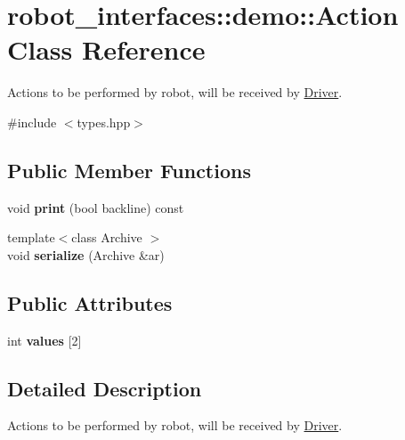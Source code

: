 \hypertarget{classrobot__interfaces_1_1demo_1_1Action}{}\section{robot\+\_\+interfaces\+:\+:demo\+:\+:Action Class Reference}
\label{classrobot__interfaces_1_1demo_1_1Action}


Actions to be performed by robot, will be received by \hyperlink{classDriver}{Driver}.  




{\ttfamily \#include $<$types.\+hpp$>$}

\subsection*{Public Member Functions}
\begin{DoxyCompactItemize}
\item 
\mbox{\label{classrobot__interfaces_1_1demo_1_1Action_a67995830d81cf6c80ae61fa1436d8670}} 
void {\bfseries print} (bool backline) const
\item 
\mbox{\label{classrobot__interfaces_1_1demo_1_1Action_ae26340c1f9b73b3bd4c447572b16f1bf}} 
{\footnotesize template$<$class Archive $>$ }\\void {\bfseries serialize} (Archive \&ar)
\end{DoxyCompactItemize}
\subsection*{Public Attributes}
\begin{DoxyCompactItemize}
\item 
\mbox{\label{classrobot__interfaces_1_1demo_1_1Action_a548fc6556545cd207c10391c8059b57a}} 
int {\bfseries values} \mbox{[}2\mbox{]}
\end{DoxyCompactItemize}


\subsection{Detailed Description}
Actions to be performed by robot, will be received by \hyperlink{classDriver}{Driver}. 


